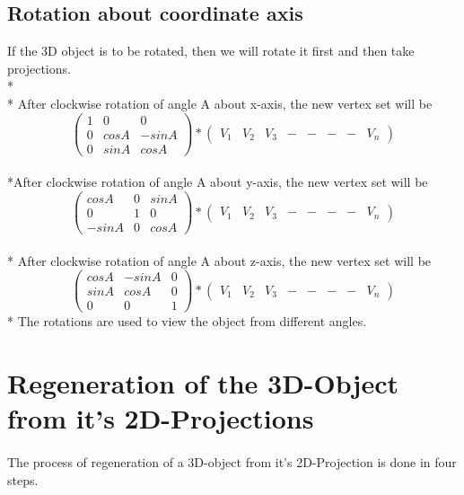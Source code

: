 \documentclass[a4paper]{article}
\begin{document}
\subsection{Rotation about coordinate axis}
If the 3D object is to be rotated,
then we will rotate it first and then take projections.
\\*\\*
After clockwise rotation of angle A about x-axis, the new vertex set will be
\[ \left( \begin{array}{cccccccc}
1&0&0\\
0&cosA&-sinA\\
0&sinA&cosA
\end{array} \right)
*
\left( \begin{array}{cccccccc}
V_1&V_2&V_3&-&-&-&-&V_n
\end{array} \right)
\] 
\\*After clockwise rotation of angle A about y-axis, the new vertex set will be
\[ \left( \begin{array}{cccccccc}
cosA&0&sinA\\
0&1&0\\
-sinA&0&cosA
\end{array} \right)
*
\left( \begin{array}{cccccccc}
V_1&V_2&V_3&-&-&-&-&V_n
\end{array} \right)
\] 
\\*
After clockwise rotation of angle A about z-axis, the new vertex set will be
\[ \left( \begin{array}{cccccccc}
cosA&-sinA&0\\
sinA&cosA&0\\
0&0&1
\end{array} \right)
*
\left( \begin{array}{cccccccc}
V_1&V_2&V_3&-&-&-&-&V_n
\end{array} \right)
\] 
\**
The rotations are used to view the object from different angles.
 
 \section{Regeneration of the 3D-Object from it's 2D-Projections}
 	\paragraph{			}
    
 	The process of regeneration of a 3D-object from it's 2D-Projection is done in four steps.
    
\end{document}
